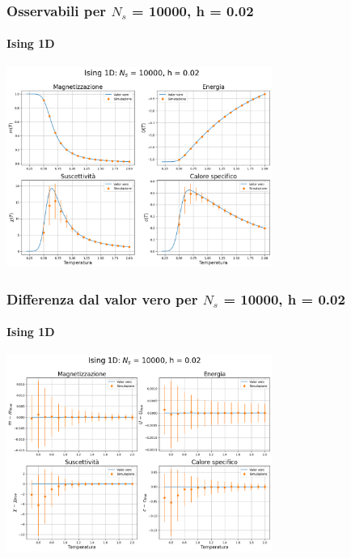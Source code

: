 \begin{frame}
    \frametitle{Osservabili per $N_s$ = 10000, h = 0.02}
    \framesubtitle{Ising 1D}

    \centering
    \includegraphics[width=0.65\textwidth]{Immagini/backupIsing1D/obs_10000_0.02.png}

\end{frame}



\begin{frame}
    \frametitle{Differenza dal valor vero per $N_s$ = 10000, h = 0.02}
    \framesubtitle{Ising 1D}

    \centering
    \includegraphics[width=0.65\textwidth]{Immagini/backupIsing1D/obs_10000_0.02_diff.png}

\end{frame}
